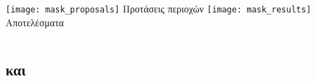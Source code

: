 \begin{frame}
  \frametitle{}
\begin{columns}
  \texttt{[image: mask\_proposals]}
  Προτάσεις περιοχών 
  \centering
  \texttt{[image: mask\_results]}
  \centering
  Αποτελέσματα
\end{columns}
\end{frame}
\subsection{ \gr και }


% 